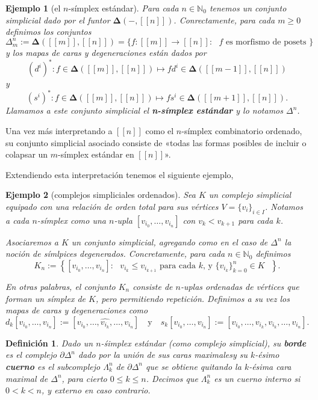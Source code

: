 \documentclass[11pt]{report}
\theoremstyle{colored}
\newtheorem{definition}{Definición}[section]
\newtheorem{example}{Ejemplo}[section]
\newcommand{\N}{\mathbb{N}}
\newcommand{\nat}[1]{[\![#1]\!]}
\newcommand{\ord}[1]{\nat{#1}}
\renewcommand{\ss}[1]{\Delta^{#1}}
\newcommand{\bss}[1]{\partial \ss{n}}
\newcommand{\horn}[2]{\Lambda^{#1}_{#2}}
\newcommand{\ordcat}{\boldsymbol{\Delta}}
\begin{document}
\begin{example}[el $n$-símplex estándar] Para cada $n \in \N_0$ tenemos un conjunto simplicial dado por el funtor $\ordcat(-,\ord{n})$. Conrectamente, para cada $m \geq 0$ definimos los conjuntos
\[
\ss{n}_m := \ordcat(\ord{m},\ord{n}) = \{f : \ord{m} \to \ord{n} : \text{ $f$ es morfismo de posets } \}
\]
y los mapas de caras y degeneraciones están dados por
\[
(d^i)^* : f \in \ordcat(\ord{m},\ord{n}) \mapsto fd^i \in \ordcat(\ord{m-1},\ord{n})
\]
y
\[
(s^i)^* : f \in \ordcat(\ord{m},\ord{n}) \mapsto fs^i \in \ordcat(\ord{m+1},\ord{n}).
\]
Llamamos a este conjunto simplicial el \textbf{n-símplex estándar} y lo notamos $\ss{n}$.
\end{example}

Una vez más interpretando a $\ord{n}$ como el $n$-símplex combinatorio ordenado, su conjunto simplicial asociado consiste de «todas las formas posibles de incluir o colapsar un $m$-símplex estándar en $\nat{n}$».

Extendiendo esta interpretación tenemos el siguiente ejemplo,

\begin{example}[complejos simpliciales ordenados] Sea $K$ un complejo simplicial equipado con una relación de orden total para sus vértices $V = \{v_i\}_{i \in I}$. Notamos a cada $n$-símplex como una $n$-upla $[v_{i_0},\dots, v_{i_n}]$ con $v_k < v_{k+1}$ para cada $k$.

Asociaremos a $K$ un conjunto simplicial, agregando como en el caso de $\ss{n}$ la noción de \textit{símlpices degenerados}. Concretamente, para cada $n \in \N_0$ definimos
\[
K_n := \left\{[v_{i_0}, \dots, v_{i_n}] : \text{ $v_{i_k} \leq v_{i_{k+1}}$ para cada $k$, y $\{v_{i_k}\}_{k = 0}^n \in K$ }\right\}.
\]

En otras palabras, el conjunto $K_n$ consiste de $n$-uplas ordenadas de vértices que forman un símplex de $K$, pero permitiendo repetición. Definimos a su vez los mapas de caras y degeneraciones como
\[
d_k[v_{i_0}, \dots, v_{i_n}] := [v_{i_0},\dots,\widehat{v_{i_k}},\dots, v_{i_n}] \quad \text{y} \quad
s_k[v_{i_0}, \dots, v_{i_n}] := [v_{i_0},\dots,v_{i_k},v_{i_k}, \dots, v_{i_n}].
\]
\end{example}

\begin{definition} Dado un $n$-śimplex estándar (como complejo simplicial), su \textbf{borde} es el complejo $\bss{n}$ dado por la unión de sus caras maximalesy su $k$-ésimo \textbf{cuerno} es el subcomplejo $\horn{n}{k}$ de $\bss{n}$ que se obtiene quitando la $k$-ésima cara maximal de $\ss{n}$, para cierto $0 \leq k \leq n$. Decimos que $\horn{n}{k}$ es un cuerno \textit{interno} si $0 < k < n$, y \textit{externo} en caso contrario.
\end{definition}
\end{document}

